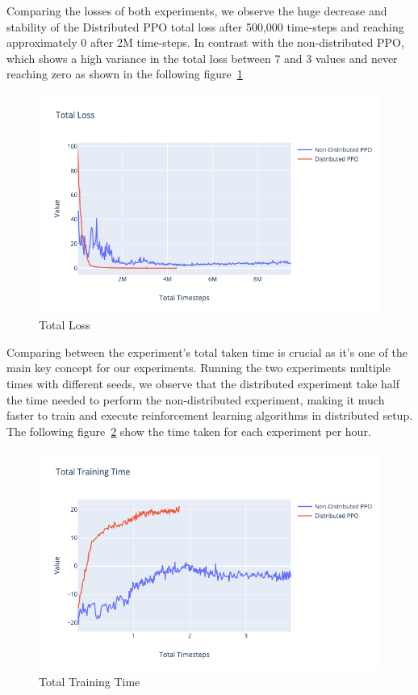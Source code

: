 Comparing the losses of both experiments, we observe the huge decrease and stability of the Distributed PPO total loss after 500,000 time-steps and reaching approximately 0 after 2M time-steps. In contrast with the non-distributed PPO, which shows a high variance in the total loss between 7 and 3 values and never reaching zero as shown in the following figure~\ref{fig:2nd_exp_total_loss}
\begin{figure}[!htb]
    \centering
    \includegraphics[width=\linewidth]{figures/exps/2nd_exp/total_loss.png}
    \caption{Total Loss}
    \label{fig:2nd_exp_total_loss}
\end{figure}

Comparing between the experiment's total taken time is crucial as it's one of the main key concept for our experiments. Running the two experiments multiple times with different seeds, we observe that the distributed experiment take half the time needed to perform the non-distributed experiment, making it much faster to train and execute reinforcement learning algorithms in distributed setup. The following figure~\ref{fig:2nd_exp_total_training_time} show the time taken for each experiment per hour.
\begin{figure}[!htb]
    \centering
    \includegraphics[width=\linewidth]{figures/exps/2nd_exp/total_training_time.png}
    \caption{Total Training Time}
    \label{fig:2nd_exp_total_training_time}
\end{figure}


